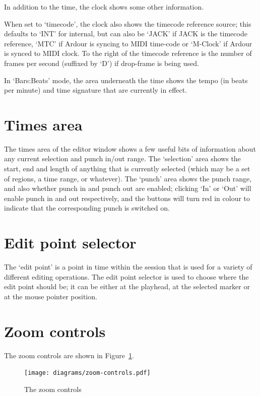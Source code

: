 \documentclass[10pt,a4paper]{book}
\begin{document}
In addition to the time, the clock shows some other information.

When set to `timecode', the clock also shows the timecode reference
source; this defaults to `INT' for internal, but can also be `JACK' if
JACK is the timecode reference, `MTC' if Ardour is syncing to MIDI
time-code or `M-Clock' if Ardour is synced to MIDI clock.  To the
right of the timecode reference is the number of frames per second
(suffixed by `D') if drop-frame is being used.

In `Bars:Beats' mode, the area underneath the time shows the tempo (in
beats per minute) and time signature that are currently in effect.

\section{Times area}

The times area of the editor window shows a few useful bits of
information about any current selection and punch in/out range.  The
`selection' area shows the start, end and length of anything that is
currently selected (which may be a set of regions, a time range, or
whatever).  The `punch' area shows the punch range, and also whether
punch in and punch out are enabled; clicking `In' or `Out' will enable
punch in and out respectively, and the buttons will turn red in colour
to indicate that the corresponding punch is switched on.

\section{Edit point selector}
\label{sec:edit-point-selector}

The `edit point' is a point in time within the session that is used
for a variety of different editing operations.  The edit point
selector is used to choose where the edit point should be; it can be
either at the playhead, at the selected marker or at the
mouse pointer position.

\section{Zoom controls}

The zoom controls are shown in Figure~\ref{fig:zoom-controls}.

\begin{figure}[ht]
\begin{center}
\texttt{[image: diagrams/zoom-controls.pdf]}
\end{center}
\caption{The zoom controls}
\label{fig:zoom-controls}
\end{figure}
\end{document}
